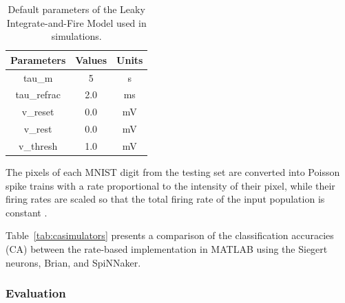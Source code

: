 %
\begin{table}[hbbp]
\centering
\caption{\label{Tab:NeuralParams}Default parameters of the Leaky Integrate-and-Fire Model used in simulations.}
\bgroup
\def\arraystretch{1.1}
  \begin{tabular}{c|c|c}
  Parameters & Values & Units \\
  \hline
  tau\_m & 5 & s\\
  tau\_refrac & 2.0 & ms\\
  v\_reset & 0.0 & mV\\
  v\_rest & 0.0 & mV\\
  v\_thresh & 1.0 & mV\\
  \end{tabular}
\egroup
\end{table}

The pixels of each MNIST digit from the testing set are converted into Poisson spike trains with a rate proportional to the intensity of their pixel, while their firing rates are scaled so that the total firing rate of the input population is constant \citep{10.3389/fnins.2013.00178}.

 
Table~\ref{tab:casimulators} presents a comparison of the classification accuracies (CA) between the rate-based implementation in MATLAB using the Siegert neurons, Brian, and SpiNNaker. %





\subsubsection{Evaluation}

